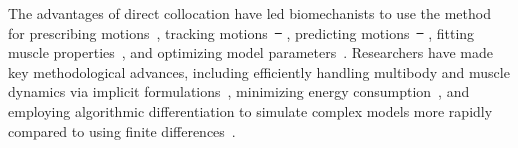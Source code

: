 \documentclass[10pt,letterpaper]{article}
\providecommand{\DIFaddtex}[1]{{\protect\color{blue}\uwave{#1}}} %
\providecommand{\DIFdeltex}[1]{{\protect\color{red}\sout{#1}}}                      %
\providecommand{\DIFaddbegin}{} %
\providecommand{\DIFaddend}{} %
\providecommand{\DIFdelbegin}{} %
\providecommand{\DIFdelend}{} %
\providecommand{\DIFadd}[1]{\texorpdfstring{\DIFaddtex{#1}}{#1}} %
\providecommand{\DIFdel}[1]{\texorpdfstring{\DIFdeltex{#1}}{}} %
\newcommand{\DIFscaledelfig}{0.5}
\newlength{\DIFdelgraphicswidth} %
\newlength{\DIFdelgraphicsheight} %
\newcommand{\DIFaddincludegraphics}[2][]{{\color{blue}\fbox{\DIFOincludegraphics[#1]{#2}}}} %
\newcommand{\DIFdelincludegraphics}[2][]{%
\sbox{\DIFdelgraphicsbox}{\DIFOincludegraphics[#1]{#2}}%
\settoboxwidth{\DIFdelgraphicswidth}{\DIFdelgraphicsbox} %
\settoboxtotalheight{\DIFdelgraphicsheight}{\DIFdelgraphicsbox} %
\scalebox{\DIFscaledelfig}{%
\parbox[b]{\DIFdelgraphicswidth}{\usebox{\DIFdelgraphicsbox}\\[-\baselineskip] \rule{\DIFdelgraphicswidth}{0em}}\llap{\resizebox{\DIFdelgraphicswidth}{\DIFdelgraphicsheight}{%
\setlength{\unitlength}{\DIFdelgraphicswidth}%
\begin{picture}(1,1)%
\thicklines\linethickness{2pt} %
{\color[rgb]{1,0,0}\put(0,0){\framebox(1,1){}}}%
{\color[rgb]{1,0,0}\put(0,0){\line( 1,1){1}}}%
{\color[rgb]{1,0,0}\put(0,1){\line(1,-1){1}}}%
\end{picture}%
}\hspace*{3pt}}} %
} %
\DeclareRobustCommand{\DIFaddbegin}{\DIFOaddbegin \let\includegraphics\DIFaddincludegraphics} %
\DeclareRobustCommand{\DIFaddend}{\DIFOaddend \let\includegraphics\DIFOincludegraphics} %
\DeclareRobustCommand{\DIFdelbegin}{\DIFOdelbegin \let\includegraphics\DIFdelincludegraphics} %
\DeclareRobustCommand{\DIFdelend}{\DIFOaddend \let\includegraphics\DIFOincludegraphics} %
\begin{document}
The advantages of direct collocation have led biomechanists to use the method for prescribing motions~\cite{Groote:2016dq,Ueno:2020}, tracking motions~\DIFdelbegin \DIFdel{\mbox{%
\cite{Kaplan:2001,Lin:2017jp,Mehrabi:2019}}\hspace{0pt}%
}\DIFdelend \DIFaddbegin \DIFadd{\mbox{%
\cite{Kaplan:2001,Lin:2017jp,Mehrabi:2019,Koelewijn:2016bm,Meyer:2016gl}}\hspace{0pt}%
}\DIFaddend , predicting motions~\DIFdelbegin \DIFdel{\mbox{%
\cite{Ackermann:2010dd,Ackermann:2012,Miller:2015fc,Porsa:2015dn,Meyer:2016gl,Koelewijn:2016bm,Lee:2016dn,Umberger:2018ec,Bobbert:2016,KMoore:2018ea,Lin:2018ex,Lai:2018,Nguyen:2019,Falisse:2019b,Jansen:2020}}\hspace{0pt}%
}\DIFdelend \DIFaddbegin \DIFadd{\mbox{%
\cite{Ackermann:2010dd,Ackermann:2012,Miller:2015fc,Porsa:2015dn,Lee:2016dn,Umberger:2018ec,Bobbert:2016,KMoore:2018ea,Lin:2018ex,Lai:2018,Nguyen:2019,Falisse:2019b,Jansen:2020}}\hspace{0pt}%
}\DIFaddend , fitting muscle properties~\cite{Falisse:2017}, and optimizing model parameters~\cite{Rohani:2017}. Researchers have made key methodological advances, including efficiently handling multibody and muscle dynamics via implicit formulations~\cite{vandenBogert:2011fv,Groote:2016dq}, minimizing energy consumption~\cite{Koelewijn:2018kw,Koelewijn:2019}, and employing algorithmic differentiation to simulate complex models more rapidly compared to using finite differences~\cite{Falisse:2019a}.
\end{document}
